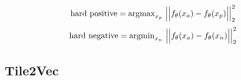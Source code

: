\begin{equation}
    \centering
    \text{hard positive} = \text{argmax}_{x_p} \ \Big|\Big|f_\theta(x_a) - f_\theta(x_p)\Big|\Big|_2^2
    \label{eq:Triplet-Loss-Hard-Positive}
\end{equation}
\begin{equation}
    \centering
    \text{hard negative} = \text{argmin}_{x_n} \ \Big|\Big|f_\theta(x_a) - f_\theta(x_n)\Big|\Big|_2^2
    \label{eq:Triplet-Loss-Hard-Negative}
\end{equation}

\subsection{Tile2Vec}
\label{sub:Tile2Vec}


